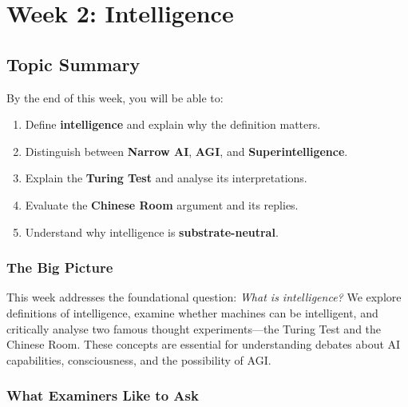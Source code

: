 \section{Week 2: Intelligence}

\subsection{Topic Summary}

\begin{keybox}
By the end of this week, you will be able to:
\begin{enumerate}
  \item Define \textbf{intelligence} and explain why the definition matters.
  \item Distinguish between \textbf{Narrow AI}, \textbf{AGI}, and \textbf{Superintelligence}.
  \item Explain the \textbf{Turing Test} and analyse its interpretations.
  \item Evaluate the \textbf{Chinese Room} argument and its replies.
  \item Understand why intelligence is \textbf{substrate-neutral}.
\end{enumerate}
\end{keybox}

\separator

\subsubsection*{The Big Picture}

This week addresses the foundational question: \textit{What is intelligence?} We explore definitions of intelligence, examine whether machines can be intelligent, and critically analyse two famous thought experiments---the Turing Test and the Chinese Room. These concepts are essential for understanding debates about AI capabilities, consciousness, and the possibility of AGI.

\separator

\subsubsection*{What Examiners Like to Ask}

